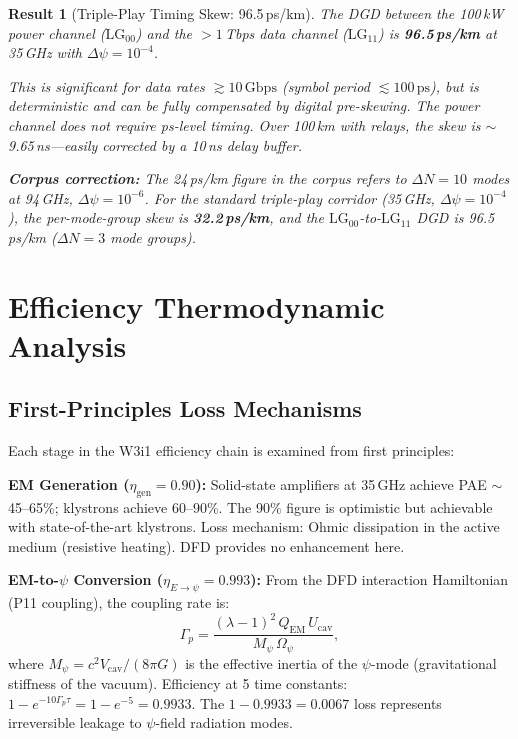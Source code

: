 \documentclass[aps,prd,twocolumn,superscriptaddress]{revtex4-2}
\newcommand{\LG}{\mathrm{LG}}
\newtheorem{result}{Result}
\begin{document}
\begin{result}[Triple-Play Timing Skew: 96.5\,ps/km]
The DGD between the 100\,kW power channel ($\LG_{00}$) and the
$>1$\,Tbps data channel ($\LG_{11}$) is \textbf{96.5\,ps/km} at
35\,GHz with $\Delta\psi = 10^{-4}$.

This is significant for data rates $\gtrsim 10\,\mathrm{Gbps}$
(symbol period $\lesssim 100\,\mathrm{ps}$), but is \emph{deterministic}
and can be fully compensated by digital pre-skewing.  The power channel
does not require ps-level timing.  Over 100\,km with relays, the skew
is $\sim$9.65\,ns---easily corrected by a 10\,ns delay buffer.

\textbf{Corpus correction:} The 24\,ps/km figure in the corpus
refers to $\Delta N = 10$ modes at 94\,GHz, $\Delta\psi = 10^{-6}$.
For the standard triple-play corridor (35\,GHz, $\Delta\psi = 10^{-4}$),
the per-mode-group skew is \textbf{32.2\,ps/km}, and the
$\LG_{00}$-to-$\LG_{11}$ DGD is 96.5\,ps/km ($\Delta N = 3$
mode groups).
\end{result}

\section{Efficiency Thermodynamic Analysis}
\label{sec:thermodynamics}

\subsection{First-Principles Loss Mechanisms}

Each stage in the W3i1 efficiency chain is examined from first principles:

\textbf{EM Generation ($\eta_\mathrm{gen} = 0.90$):}
Solid-state amplifiers at 35\,GHz achieve PAE $\sim$45--65\%; klystrons
achieve 60--90\%.  The 90\% figure is optimistic but achievable with
state-of-the-art klystrons.  Loss mechanism: Ohmic dissipation in the
active medium (resistive heating).  DFD provides no enhancement here.

\textbf{EM-to-$\psi$ Conversion ($\eta_{E\to\psi} = 0.993$):}
From the DFD interaction Hamiltonian (P11 coupling), the coupling
rate is:
\begin{equation}
\Gamma_p = \frac{(\lambda-1)^2\,Q_\mathrm{EM}\,U_\mathrm{cav}}
{M_\psi\,\Omega_\psi},
\end{equation}
where $M_\psi = c^2 V_\mathrm{cav}/(8\pi G)$ is the effective inertia
of the $\psi$-mode (gravitational stiffness of the vacuum).
Efficiency at 5 time constants: $1 - e^{-10\Gamma_p\tau} = 1 - e^{-5}
= 0.9933$.  The $1 - 0.9933 = 0.0067$ loss represents irreversible
leakage to $\psi$-field radiation modes.
\end{document}
